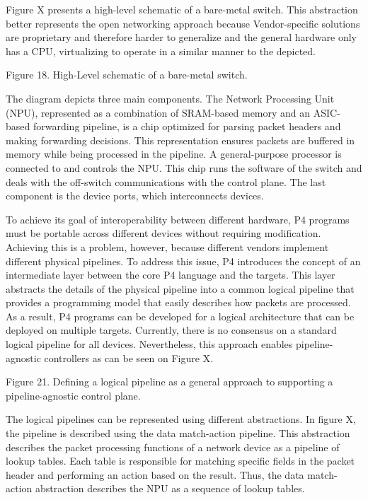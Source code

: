 Figure X presents a high-level schematic of a bare-metal switch. This abstraction better represents the open networking approach because Vendor-specific solutions are proprietary and therefore harder to generalize and the general hardware only has a CPU, virtualizing to operate in a similar manner to the depicted.

Figure 18. High-Level schematic of a bare-metal switch. \cite{peterson_software-defined_2021}

The diagram depicts three main components. The Network Processing Unit (NPU), represented as a combination of SRAM-based memory and an ASIC-based forwarding pipeline, is a chip optimized for parsing packet headers and making forwarding decisions. This representation ensures packets are buffered in memory while being processed in the pipeline.  A general-purpose processor is connected to and controls the NPU. This chip runs the software of the switch and deals with the off-switch communications with the control plane. The last component is the device ports, which interconnects devices.\cite{peterson_software-defined_2021}

To achieve its goal of interoperability between different hardware, P4 programs must be portable across different devices without requiring modification. Achieving this is a problem, however, because different vendors implement different physical pipelines. To address this issue, P4 introduces the concept of an intermediate layer between the core P4 language and the targets\cite{hauser_survey_2021}. This layer abstracts the details of the physical pipeline into a common logical pipeline that provides a programming model that easily describes how packets are processed. As a result, P4 programs can be developed for a logical architecture that can be deployed on multiple targets. Currently, there is no consensus on a standard logical pipeline for all devices. Nevertheless, this approach enables pipeline-agnostic controllers as can be seen on Figure X. \cite{peterson_software-defined_2021}

Figure 21. Defining a logical pipeline as a general approach to supporting a pipeline-agnostic control plane.

The logical pipelines can be represented using different abstractions. In figure X, the pipeline is described using the data match-action pipeline. This abstraction describes the packet processing functions of a network device as a pipeline of lookup tables. Each table is responsible for matching specific fields in the packet header and performing an action based on the result\cite{bifulco_survey_2018}\cite{kreutz_software-defined_2015}. Thus, the data match-action abstraction describes the NPU as a sequence of lookup tables. 

